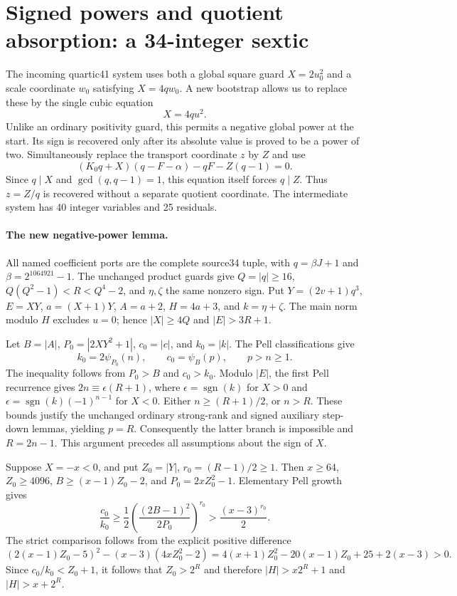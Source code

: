 \section{Signed powers and quotient absorption: a 34-integer sextic}
The incoming quartic41 system uses both a global square guard
$X=2u_0^2$ and a scale coordinate $w_0$ satisfying $X=4qw_0$.
A new bootstrap allows us to replace these by the single cubic equation
\[
 X=4qu^2.
\]
Unlike an ordinary positivity guard, this permits a negative global power
at the start. Its sign is recovered only after its absolute value is
proved to be a power of two. Simultaneously replace the transport
coordinate $z$ by $Z$ and use
\[
 (K_0q+X)(q-F-\alpha)-qF-Z(q-1)=0.
\]
Since $q\mid X$ and $\gcd(q,q-1)=1$, this equation itself forces $q\mid Z$.
Thus $z=Z/q$ is recovered without a separate quotient coordinate.
The intermediate system has 40 integer variables and 25 residuals.

\paragraph{The new negative-power lemma.}
All named coefficient ports are the complete source34 tuple, with
$q=\beta J+1$ and $\beta=2^{1064921}-1$.
The unchanged product guards give $Q=|q|\ge16$,
$Q(Q^2-1)<R<Q^4-2$, and $\eta,\zeta$ the same nonzero sign.
Put $Y=(2v+1)q^3$, $E=XY$, $a=(X+1)Y$, $A=a+2$,
$H=4a+3$, and $k=\eta+\zeta$.
The main norm modulo $H$ excludes $u=0$; hence
$|X|\ge4Q$ and $|E|>3R+1$.

Let $B=|A|$, $P_0=|2XY^2+1|$, $c_0=|c|$, and $k_0=|k|$.
The Pell classifications give
\[
 k_0=2\psi_{P_0}(n),\qquad c_0=\psi_B(p),\qquad p>n\ge1.
\]
The inequality follows from $P_0>B$ and $c_0>k_0$.
Modulo $|E|$, the first Pell recurrence gives
$2n\equiv\epsilon(R+1)$, where
$\epsilon=\operatorname{sgn}(k)$ for $X>0$ and
$\epsilon=\operatorname{sgn}(k)(-1)^{n-1}$ for $X<0$.
Either $n\ge(R+1)/2$, or $n>R$.
These bounds justify the unchanged ordinary strong-rank and signed
auxiliary step-down lemmas, yielding $p=R$.
Consequently the latter branch is impossible and $R=2n-1$.
This argument precedes all assumptions about the sign of $X$.

Suppose $X=-x<0$, and put $Z_0=|Y|$, $r_0=(R-1)/2\ge1$.
Then $x\ge64$, $Z_0\ge4096$, $B\ge(x-1)Z_0-2$, and
$P_0=2xZ_0^2-1$.
Elementary Pell growth gives
\[
 \frac{c_0}{k_0}
 \ge\frac12\left(\frac{(2B-1)^2}{2P_0}\right)^{r_0}
 >\frac{(x-3)^{r_0}}2.
\]
The strict comparison follows from the explicit positive difference
\[
 (2(x-1)Z_0-5)^2-(x-3)(4xZ_0^2-2)
 =4(x+1)Z_0^2-20(x-1)Z_0+25+2(x-3)>0.
\]
Since $c_0/k_0<Z_0+1$, it follows that $Z_0>2^R$ and therefore
$|H|>x2^R+1$ and $|H|>x+2^R$.

